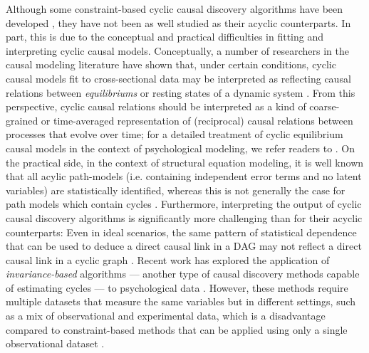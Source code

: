 \documentclass[twoside, 11pt]{article}
\begin{document}
Although some constraint-based cyclic causal discovery algorithms have been developed \citep{mooij_classen2020, richardson1996, strobl2019}, they have not been as well studied as their acyclic counterparts. In part, this is due to the conceptual and practical difficulties in fitting and interpreting cyclic causal models. Conceptually, a number of researchers in the causal modeling literature have shown that, under certain conditions, cyclic causal models fit to cross-sectional data may be interpreted as reflecting causal relations between \textit{equilibriums} or resting states of a dynamic system \citep{iwasaki1994causality, dash2005restructuring, strotz1960recursive, spirtes1995directed, mooij2013ordinary, weinberger2021intervening, bongers2022causal}. From this perspective, cyclic causal relations should be interpreted as a kind of coarse-grained or time-averaged representation of (reciprocal) causal relations between processes that evolve over time; for a detailed treatment of cyclic equilibrium causal models in the context of psychological modeling, we refer readers to \cite{ryan2022equilibrium}. On the practical side, in the context of structural equation modeling, it is well known that all acylic path-models (i.e. containing independent error terms and no latent variables) are statistically identified, whereas this is not generally the case for path models which contain cycles \citep{Bongers2021, bollen_structural_1989}.
Furthermore, interpreting the output of cyclic causal discovery algorithms is significantly more challenging than for their acyclic counterparts: Even in ideal scenarios, the same pattern of statistical dependence that can be used to deduce a direct causal link in a DAG may not reflect a direct causal link in a cyclic graph \citep{bongers2018theoretical, hyttinen_discovering_2013}. 
Recent work has explored the application of \textit{invariance-based} algorithms --- another type of causal discovery methods capable of estimating cycles --- to psychological data \citep{Kossakowski2021}. However, these methods require multiple datasets that measure the same variables but in different settings, such as a mix of observational and experimental data, which is a disadvantage compared to constraint-based methods that can be applied using only a single observational dataset \citep{peters_causal_2016, Glymour2019}. 
\end{document}
